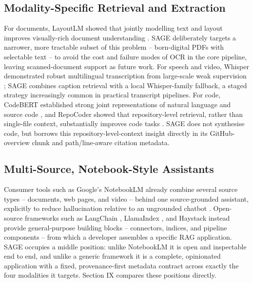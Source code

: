 \documentclass[conference]{IEEEtran}
\begin{document}
\subsection{Modality-Specific Retrieval and Extraction}
For documents, LayoutLM showed that jointly modelling text and layout
improves visually-rich document understanding \cite{xu2020layoutlm}.
SAGE deliberately targets a narrower, more tractable subset of this
problem -- born-digital PDFs with selectable text -- to avoid the cost
and failure modes of OCR in the core pipeline, leaving scanned-document
support as future work. For speech and video, Whisper demonstrated
robust multilingual transcription from large-scale weak supervision
\cite{radford2023whisper}; SAGE combines caption retrieval with a local
Whisper-family fallback, a staged strategy increasingly common in
practical transcript pipelines. For code, CodeBERT established strong
joint representations of natural language and source code
\cite{feng2020codebert}, and RepoCoder showed that repository-level
retrieval, rather than single-file context, substantially improves code
tasks \cite{zhang2023repocoder}. SAGE does not synthesise code, but
borrows this repository-level-context insight directly in its
GitHub-overview chunk and path/line-aware citation metadata.

\subsection{Multi-Source, Notebook-Style Assistants}
Consumer tools such as Google's NotebookLM already combine several
source types -- documents, web pages, and video -- behind one
source-grounded assistant, explicitly to reduce hallucination relative
to an ungrounded chatbot \cite{notebooklm2026}. Open-source frameworks
such as LangChain \cite{langchain2026}, LlamaIndex \cite{llamaindex2026},
and Haystack \cite{haystack2026} instead provide general-purpose
building blocks -- connectors, indices, and pipeline components -- from
which a developer assembles a specific RAG application. SAGE occupies a
middle position: unlike NotebookLM it is open and inspectable end to
end, and unlike a generic framework it is a complete, opinionated
application with a fixed, provenance-first metadata contract across
exactly the four modalities it targets. Section IX compares these
positions directly.
\end{document}
